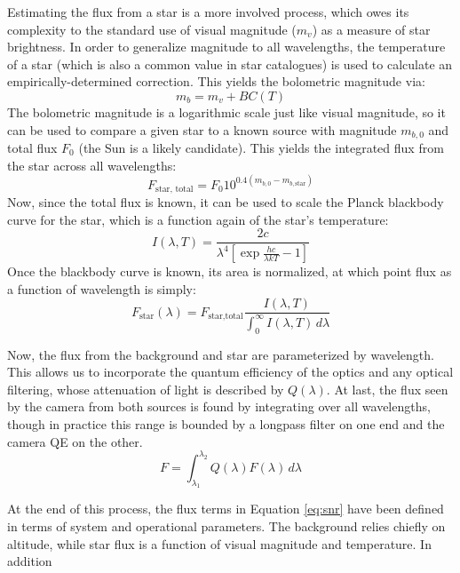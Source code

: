 \documentclass[twocolumn,letterpaper]{IEEEAerospace2012}
\newcommand{\parens} [1] {\left(  #1  \right)}
\newcommand{\brackets} [1] {\left[ #1 \right]}
\newcommand{\BC}{\mathit{BC}}
\newcommand{\sub}[1]{\text{#1}} %
\begin{document}
Estimating the flux from a star is a more involved process, which owes its complexity to the standard use of visual magnitude ($m_v$) as a measure of star brightness. In order to generalize magnitude to all wavelengths, the temperature of a star (which is also a common value in star catalogues) is used to calculate an empirically-determined correction. %
This yields the bolometric magnitude via:
\begin{equation}
    \label{eq:bolometric}
    m_b = m_v + \BC (T)
\end{equation}
The bolometric magnitude is a logarithmic scale just like visual magnitude, so it can be used to compare a given star to a known source with magnitude $m_{b,0}$ and total flux $F_0$ (the Sun is a likely candidate). This yields the integrated flux from the star across all wavelengths:
\begin{equation}
    \label{eq:totalflux}
    F_{\sub{star, total}} = F_0 10^{0.4 \parens{m_{b,0} - m_{b,\sub{star}}}}
\end{equation}
Now, since the total flux is known, it can be used to scale the Planck blackbody curve for the star, which is a function again of the star's temperature:
\begin{equation}
    \label{eq:planck}
    I(\lambda, T) = \frac{2c}{\lambda^4 \brackets{\exp{\frac{hc}{\lambda k T}} - 1}}
\end{equation}
Once the blackbody curve is known, its area is normalized, at which point flux as a function of wavelength is simply:
\begin{equation}
    \label{eq:flux}
    F_{\sub{star}}(\lambda) = F_{\sub{star,total}}\frac{I(\lambda,T)}{\int_0^\infty I(\lambda,T) \, d\lambda}
\end{equation}

Now, the flux from the background and star are parameterized by wavelength. This allows us to incorporate the quantum efficiency of the optics and any optical filtering, whose attenuation of light is described by $Q(\lambda)$. At last, the flux seen by the camera from both sources is found by integrating over all wavelengths, though in practice this range is bounded by a longpass filter on one end and the camera QE on the other. 
\begin{equation}
    \label{eq:totalfluxes}
    F = \int_{\lambda_1}^{\lambda_2} Q(\lambda) F(\lambda) \, d\lambda 
\end{equation}

At the end of this process, the flux terms in Equation \ref{eq:snr} have been defined in terms of system and operational parameters. The background relies chiefly on altitude, while star flux is a function of visual magnitude and temperature. In addition  
\end{document}
